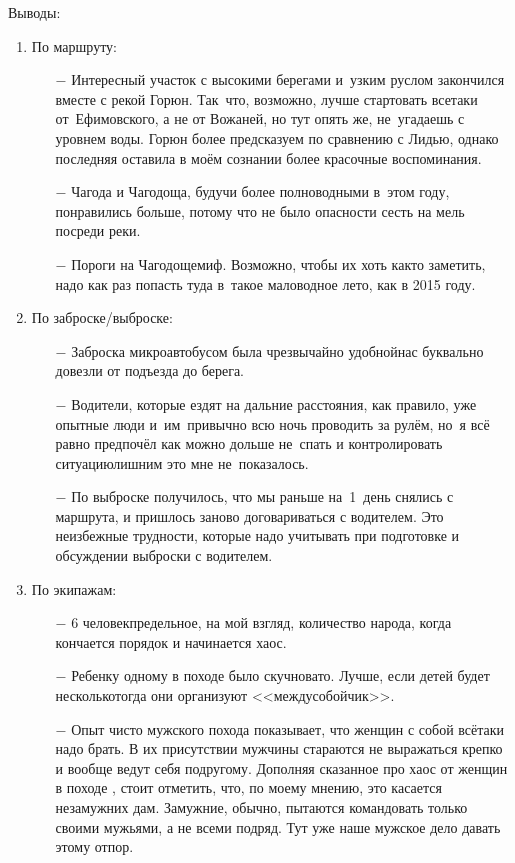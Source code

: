Выводы:
\begin{enumerate}
\item По маршруту:
	\begin{enumerate}
	\item[$-$] Интересный участок с высокими берегами и~узким руслом закончился вместе с рекой Горюн. Так~что, возможно, лучше стартовать все\sdash таки от~Ефимовского, а не от Вожаней, но тут опять же, не~угадаешь с уровнем воды. Горюн более предсказуем по сравнению с Лидью, однако последняя оставила в моём сознании более красочные воспоминания.
	\item[$-$] Чагода и Чагодоща, будучи более полноводными в~этом году, понравились больше, потому что не было опасности сесть на мель посреди реки.
	\item[$-$] Пороги на Чагодоще\mdash миф. Возможно, чтобы их хоть как\sdash то заметить, надо как раз попасть туда в~такое маловодное лето, как в 2015 году.	
	\end{enumerate}	
\item По заброске/выброске:
	\begin{enumerate}
	\item[$-$] Заброска микроавтобусом была чрезвычайно удобной\mdash нас буквально довезли от подъезда до берега.
	\item[$-$] Водители, которые ездят на дальние расстояния, как правило, уже опытные люди и~им~привычно всю ночь проводить за рулём, но~я всё равно предпочёл как можно дольше не~спать и контролировать ситуацию\mdash лишним это мне не~показалось.
	\item[$-$] По выброске получилось, что мы раньше на~1~день снялись с маршрута, и пришлось заново договариваться с водителем. Это неизбежные трудности, которые надо учитывать при подготовке и обсуждении выброски с водителем.
	\end{enumerate}	
\item По экипажам:
	\begin{enumerate}
	\item[$-$] 6 человек\mdash предельное, на мой взгляд, количество народа, когда кончается порядок и начинается хаос.
	\item[$-$] Ребенку одному в походе было скучновато. Лучше, если детей будет несколько\mdash тогда они организуют <<междусобойчик>>.
	\item[$-$] Опыт чисто мужского похода показывает, что женщин с собой всё\sdash таки надо брать. В их присутствии мужчины стараются не выражаться крепко и вообще ведут себя по\sdash другому. Дополняя сказанное про хаос от женщин в походе \cite{Квадригин}, стоит отметить, что, по моему мнению, это касается незамужних дам. Замужние, обычно, пытаются командовать только своими мужьями, а не всеми подряд. Тут уже наше мужское дело давать этому отпор.

\end{enumerate}
\end{enumerate}
